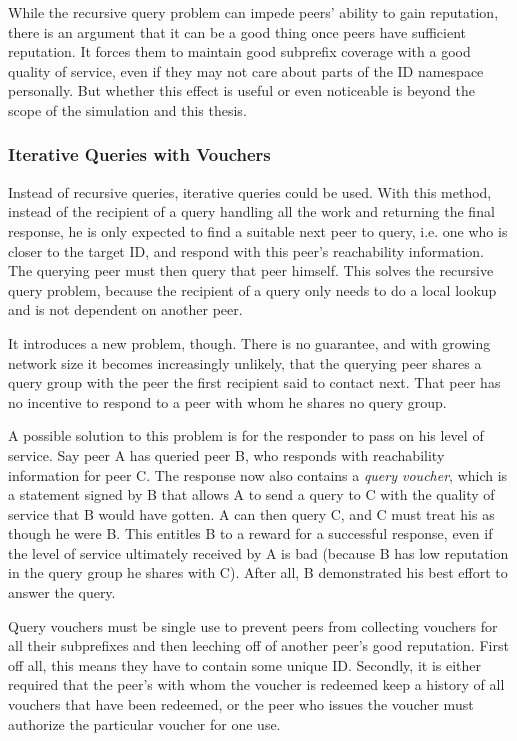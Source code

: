 While the recursive query problem can impede peers' ability to gain reputation,
there is an argument that it can be a good thing once peers have sufficient
reputation. It forces them to maintain good subprefix coverage with a good
quality of service, even if they may not care about parts of the ID namespace
personally. But whether this effect is useful or even noticeable is beyond the
scope of the simulation and this thesis.

\subsubsection{Iterative Queries with Vouchers}
\label{sec:desc_iterative_vouchers}
Instead of recursive queries, iterative queries could be used. With this method,
instead of the recipient of a query handling all the work and returning the
final response, he is only expected to find a suitable next peer to query, i.e.
one who is closer to the target ID, and respond with this peer's reachability
information. The querying peer must then query that peer himself. This solves
the recursive query problem, because the recipient of a query only needs to do a
local lookup and is not dependent on another peer.

It introduces a new problem, though. There is no guarantee, and with growing
network size it becomes increasingly unlikely, that the querying peer shares a
query group with the peer the first recipient said to contact next. That peer
has no incentive to respond to a peer with whom he shares no query group.

A possible solution to this problem is for the responder to pass on his level of
service. Say peer A has queried peer B, who responds with reachability
information for peer C. The response now also contains a \emph{query voucher},
which is a statement signed by B that allows A to send a query to C with the
quality of service that B would have gotten. A can then query C, and C must
treat his as though he were B. This entitles B to a reward for a successful
response, even if the level of service ultimately received by A is bad (because
B has low reputation in the query group he shares with C). After all, B
demonstrated his best effort to answer the query.

Query vouchers must be single use to prevent peers from collecting vouchers for
all their subprefixes and then leeching off of another peer's good reputation.
First off all, this means they have to contain some unique ID. Secondly, it is
either required that the peer's with whom the voucher is redeemed keep a history
of all vouchers that have been redeemed, or the peer who issues the voucher must
authorize the particular voucher for one use.

